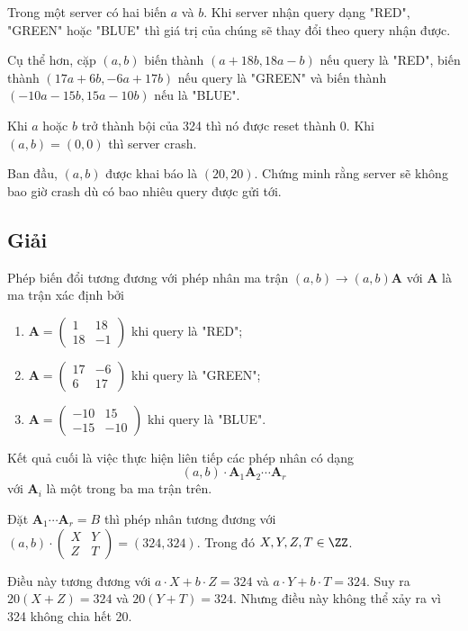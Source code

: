 Trong một server có hai biến $a$ và $b$. Khi server nhận query dạng "RED", "GREEN" hoặc "BLUE" thì giá trị của chúng sẽ thay đổi theo query nhận được.

Cụ thể hơn, cặp $(a, b)$ biến thành $(a + 18b, 18a - b)$ nếu query là "RED", biến thành $(17a + 6b, -6a + 17b)$ nếu query là "GREEN" và biến thành $(-10a-15b, 15a-10b)$ nếu là "BLUE".

Khi $a$ hoặc $b$ trở thành bội của 324 thì nó được reset thành 0. Khi $(a, b) = (0, 0)$ thì server crash.

Ban đầu, $(a, b)$ được khai báo là $(20, 20)$. Chứng minh rằng server sẽ không bao giờ crash dù có bao nhiêu query được gửi tới.

\subsection*{Giải}

Phép biến đổi tương đương với phép nhân ma trận $(a, b) \to (a, b) \bm{A}$ với $\bm{A}$ là ma trận xác định bởi

\begin{enumerate}
    \item $\bm{A} = \begin{pmatrix} 1 & 18 \\ 18 & -1 \end{pmatrix}$ khi query là "RED";
    \item $\bm{A} = \begin{pmatrix} 17 & -6 \\ 6 & 17 \end{pmatrix}$ khi query là "GREEN";
    \item $\bm{A} = \begin{pmatrix} -10 & 15 \\ -15 & -10 \end{pmatrix}$ khi query là "BLUE".
\end{enumerate}

Kết quả cuối là việc thực hiện liên tiếp các phép nhân có dạng \[ (a, b) \cdot \bm{A}_1 \bm{A}_2 \cdots \bm{A}_r \] với $\bm{A}_i$ là một trong ba ma trận trên.

Đặt $\bm{A}_1 \cdots \bm{A}_r = B$ thì phép nhân tương đương với $(a, b) \cdot \begin{pmatrix} X & Y \\ Z & T \end{pmatrix} = (324, 324)$. Trong đó $X, Y, Z, T \in \ZZ$.

Điều này tương đương với $a \cdot X + b \cdot Z = 324$ và $a \cdot Y + b \cdot T = 324$. Suy ra $20 (X + Z) = 324$ và $20 (Y + T) = 324$. Nhưng điều này không thể xảy ra vì 324 không chia hết 20.

